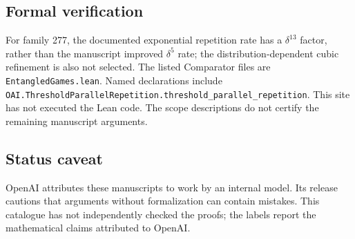 \documentclass[11pt]{article}
\begin{document}
\subsection{Formal verification}
For family 277, the documented exponential repetition rate has a $\delta^{13}$ factor, rather than the manuscript improved $\delta^5$ rate; the distribution-dependent cubic refinement is also not selected. The listed Comparator files are \texttt{EntangledGames.lean}. Named declarations include \texttt{OAI.ThresholdParallelRepetition.threshold\_parallel\_repetition}. This site has not executed the Lean code. The scope descriptions do not certify the remaining manuscript arguments.

\subsection{Status caveat}
OpenAI attributes these manuscripts to work by an internal model. Its release cautions that arguments without formalization can contain mistakes. This catalogue has not independently checked the proofs; the labels report the mathematical claims attributed to OpenAI.
\end{document}
